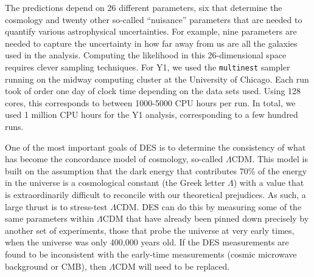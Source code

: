 \documentclass[12pt]{article}
\begin{document}
\begin{small}
The predictions depend on 26 different parameters, six that determine the cosmology and twenty other so-called ``nuisance'' parameters that are needed to quantify various astrophysical uncertainties. For example, nine parameters are needed to capture the uncertainty in how far away from us are all the galaxies used in the analysis. Computing the likelihood in this 26-dimensional space requires clever sampling techniques. For Y1, we used the {\tt multinest} sampler~\cite{Feroz:2008xx} running on the midway computing cluster at the University of Chicago. Each run took of order one day of clock time depending on the data sets used. Using 128 cores, this corresponds to between 1000-5000 CPU hours per run. In total, we used 1 million CPU hours for the Y1 analysis, corresponding to a few hundred runs. 

One of the most important goals of DES is to determine the consistency of what has become the concordance model of cosmology, so-called $\Lambda$CDM. This model is built on the assumption that the dark energy that contributes 70\% of the energy in the universe is a cosmological constant (the Greek letter $\Lambda$) with a value that is extraordinarily difficult to reconcile with our theoretical prejudices. As such, a large thrust is to stress-test $\Lambda$CDM. DES can do this by measuring some of the same parameters within $\Lambda$CDM that have already been pinned down precisely by another set of experiments, those that probe the universe at very early times, when the universe was only 400,000 years old. If the DES measurements are found to be inconsistent with the early-time measurements (cosmic microwave background or CMB), then $\Lambda$CDM will need to be replaced.

%



\end{small}
\end{document}
